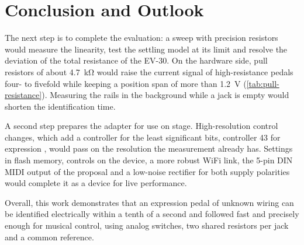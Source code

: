 
\chapter{Conclusion and Outlook}
\label{ch:conclusion}

The next step is to complete the evaluation: a sweep with precision resistors would measure the linearity, test the settling model at its limit and resolve the deviation of the total resistance of the EV-30. On the hardware side, pull resistors of about \qty{4.7}{\kilo\ohm} would raise the current signal of high-resistance pedals four- to fivefold while keeping a position span of more than \qty{1.2}{\volt} (\cref{tab:pull-resistance}). Measuring the rails in the background while a jack is empty would shorten the identification time.

A second step prepares the adapter for use on stage. High-resolution control changes, which add a controller for the least significant bits, controller 43 for expression \cite{midi2026controlchange}, would pass on the resolution the measurement already has. Settings in flash memory, controls on the device, a more robust WiFi link, the 5-pin DIN MIDI output of the proposal \cite{benson2026proposal} and a low-noise rectifier for both supply polarities would complete it as a device for live performance.

Overall, this work demonstrates that an expression pedal of unknown wiring can be identified electrically within a tenth of a second and followed fast and precisely enough for musical control, using analog switches, two shared resistors per jack and a common reference.
